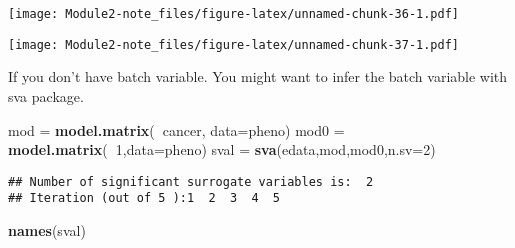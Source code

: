\documentclass[]{article}
\newenvironment{Shaded}{\begin{snugshade}}{\end{snugshade}}
\newcommand{\KeywordTok}[1]{\textcolor[rgb]{0.13,0.29,0.53}{\textbf{#1}}}
\newcommand{\DataTypeTok}[1]{\textcolor[rgb]{0.13,0.29,0.53}{#1}}
\newcommand{\DecValTok}[1]{\textcolor[rgb]{0.00,0.00,0.81}{#1}}
\newcommand{\StringTok}[1]{\textcolor[rgb]{0.31,0.60,0.02}{#1}}
\newcommand{\OperatorTok}[1]{\textcolor[rgb]{0.81,0.36,0.00}{\textbf{#1}}}
\newcommand{\NormalTok}[1]{#1}
\begin{document}
\texttt{[image: Module2-note\_files/figure-latex/unnamed-chunk-36-1.pdf]}

\begin{Shaded}
\end{Shaded}

\texttt{[image: Module2-note\_files/figure-latex/unnamed-chunk-37-1.pdf]}

If you don't have batch variable. You might want to infer the batch
variable with sva package.

\begin{Shaded}
\begin{Highlighting}[]
\NormalTok{mod =}\StringTok{ }\KeywordTok{model.matrix}\NormalTok{(}\OperatorTok{~}\NormalTok{cancer, }\DataTypeTok{data=}\NormalTok{pheno)}
\NormalTok{mod0 =}\StringTok{ }\KeywordTok{model.matrix}\NormalTok{(}\OperatorTok{~}\DecValTok{1}\NormalTok{,}\DataTypeTok{data=}\NormalTok{pheno)}
\NormalTok{sval =}\StringTok{ }\KeywordTok{sva}\NormalTok{(edata,mod,mod0,}\DataTypeTok{n.sv=}\DecValTok{2}\NormalTok{)}
\end{Highlighting}
\end{Shaded}

\begin{verbatim}
## Number of significant surrogate variables is:  2 
## Iteration (out of 5 ):1  2  3  4  5
\end{verbatim}

\begin{Shaded}
\begin{Highlighting}[]
\KeywordTok{names}\NormalTok{(sval)}
\end{Highlighting}
\end{Shaded}
\end{document}
